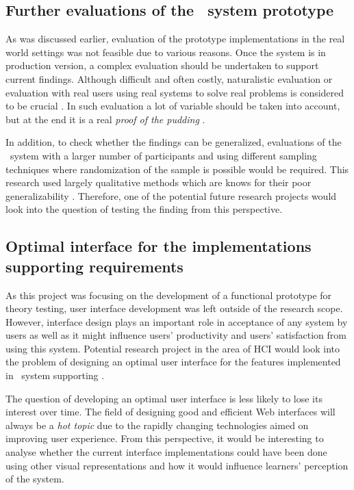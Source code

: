 \subsection{Further evaluations of the \ep~system prototype}
As was discussed earlier, evaluation of the prototype implementations in the
real world settings was not feasible due to various reasons. Once the system is
in production version, a complex evaluation should be undertaken to support
current findings. Although difficult and often costly, naturalistic evaluation
or evaluation with real users using real systems to solve real problems is
considered to be crucial \citep{Pries-Heje2008}. In such evaluation a lot of
variable should be taken into account, but at the end it is a real \textit{proof
of the pudding} \citep{Venable2010}.

In addition, to check whether the findings can be generalized, evaluations of
the \ep~system with a larger number of participants and using different sampling
techniques where randomization of the sample is possible would be required. This
research used largely qualitative methods which are knows for their poor
generalizability \citep{Trochim2001}. Therefore, one of the potential future
research projects would look into the question of testing the finding from this
perspective.

\subsection[Optimal interface design]{Optimal interface for the implementations
supporting \LLLs requirements} 

As this project was focusing on the development of a functional prototype for
theory testing, user interface development was left outside of the research
scope. However, interface design plays an important role in acceptance of any
system by users as well as it might influence users' productivity and users'
satisfaction from using this system. Potential research project in the area of
HCI would look into the problem of designing an optimal user interface for the
features implemented in \ep~system supporting \LLLsn. 

The question of developing an optimal user interface is less likely to lose its
interest over time. The field of designing good and efficient Web interfaces
will always be a \textit{hot topic} due to the rapidly changing technologies
aimed on improving user experience. From this perspective, it would be
interesting to analyse whether the current interface implementations could have
been done using other visual representations and how it would influence
learners' perception of the system.


